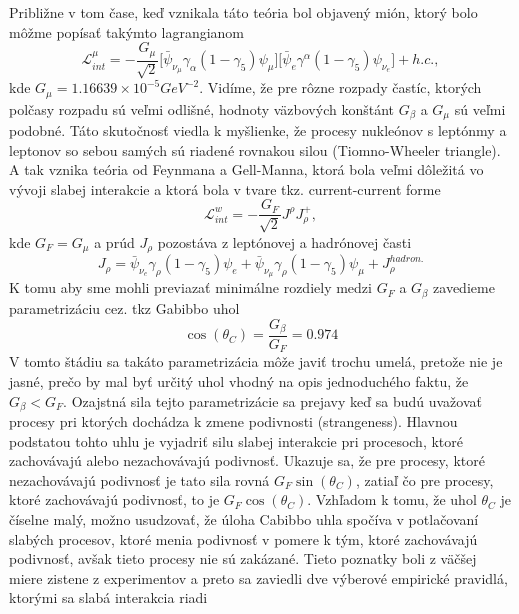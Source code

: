 \documentclass[../../main.tex]{subfiles}
\begin{document}
Približne v tom čase, keď vznikala táto teória bol objavený mión, ktorý bolo môžme popísať takýmto lagrangianom
\begin{equation}
\mathcal{L}^{\mu}_{int}=-\frac{G_{\mu}}{\sqrt{2}}\big[ \bar{\psi}_{\nu_{\mu}}\gamma_{\alpha}(1-\gamma_5)\psi_{\mu} \big] \big[ \bar{\psi}_e\gamma^{\alpha}(1-\gamma_5)\psi_{\nu_{e}} \big]+h.c.,
\end{equation}
kde $G_{\mu}=1.16639\times 10^{-5} GeV^{-2}$. Vidíme, že pre rôzne rozpady častíc, ktorých polčasy rozpadu sú veľmi odlišné, hodnoty väzbových konštánt $G_{\beta}$ a $G_{\mu}$ sú veľmi podobné. Táto skutočnosť viedla k myšlienke, že procesy nukleónov s leptónmy a leptonov so sebou samých sú riadené rovnakou silou (Tiomno-Wheeler triangle). A tak vznika teória od Feynmana a Gell-Manna, ktorá bola veľmi dôležitá vo vývoji slabej interakcie a ktorá bola v tvare tkz. current-current forme
\begin{equation}
\mathcal{L}^{w}_{int}=-\frac{G_F}{\sqrt{2}}J^{\rho}J^{+}_{\rho},
\end{equation} 
kde $G_F = G_{\mu}$ a prúd $J_{\rho}$ pozostáva z leptónovej a hadrónovej časti
\begin{equation}
J_{\rho}=\bar{\psi}_{\nu_{e}}\gamma_{\rho}(1-\gamma_5)\psi_{e} + \bar{\psi}_{\nu_{\mu}}\gamma_{\rho}(1-\gamma_5)\psi_{\mu}+J_{\rho}^{hadron.}
\end{equation}
K tomu aby sme mohli previazať minimálne rozdiely medzi $G_F$ a 
$G_{\beta}$ zavedieme parametrizáciu cez. tkz Gabibbo uhol
\begin{equation}
\cos (\theta_C)=\frac{G_{\beta}}{G_{F}}=0.974
\end{equation}
V tomto štádiu sa takáto parametrizácia môže javiť trochu umelá, pretože nie je jasné, prečo by mal byť určitý uhol vhodný na opis jednoduchého faktu, že $G_{\beta}<G_F$. Ozajstná sila tejto parametrizácie sa prejavy keď sa budú uvažovať procesy pri ktorých dochádza k zmene podivnosti (strangeness). Hlavnou podstatou tohto uhlu je vyjadriť silu slabej interakcie pri procesoch, ktoré zachovávajú alebo nezachovávajú podivnosť. Ukazuje sa, že pre procesy, ktoré nezachovávajú podivnosť je tato sila rovná $G_F\sin(\theta_C)$, zatiaľ čo pre procesy, ktoré zachovávajú podivnosť, to je $G_F\cos(\theta_C)$. Vzhľadom k tomu, že uhol $\theta_C$ je číselne malý, možno usudzovať, že úloha Cabibbo uhla spočíva v potlačovaní slabých procesov, ktoré menia podivnosť v pomere k tým, ktoré zachovávajú podivnosť, avšak tieto procesy nie sú zakázané. Tieto poznatky boli z väčšej miere zistene z experimentov a preto sa zaviedli dve výberové empirické pravidlá, ktorými sa slabá interakcia riadi
\end{document}
